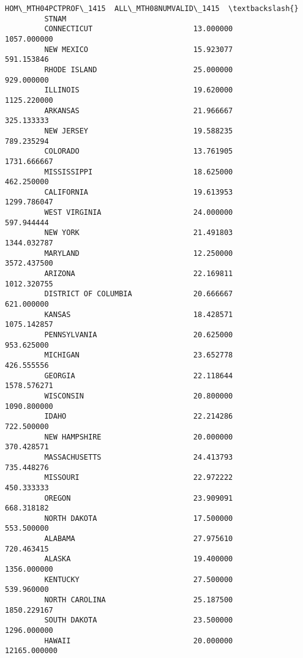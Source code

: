\documentclass[11pt]{article}
\begin{document}
\begin{Verbatim}[commandchars=\\\{\}]
                               HOM\_MTH04PCTPROF\_1415  ALL\_MTH08NUMVALID\_1415  \textbackslash{}
         STNAM                                                                 
         CONNECTICUT                       13.000000             1057.000000   
         NEW MEXICO                        15.923077              591.153846   
         RHODE ISLAND                      25.000000              929.000000   
         ILLINOIS                          19.620000             1125.220000   
         ARKANSAS                          21.966667              325.133333   
         NEW JERSEY                        19.588235              789.235294   
         COLORADO                          13.761905             1731.666667   
         MISSISSIPPI                       18.625000              462.250000   
         CALIFORNIA                        19.613953             1299.786047   
         WEST VIRGINIA                     24.000000              597.944444   
         NEW YORK                          21.491803             1344.032787   
         MARYLAND                          12.250000             3572.437500   
         ARIZONA                           22.169811             1012.320755   
         DISTRICT OF COLUMBIA              20.666667              621.000000   
         KANSAS                            18.428571             1075.142857   
         PENNSYLVANIA                      20.625000              953.625000   
         MICHIGAN                          23.652778              426.555556   
         GEORGIA                           22.118644             1578.576271   
         WISCONSIN                         20.800000             1090.800000   
         IDAHO                             22.214286              722.500000   
         NEW HAMPSHIRE                     20.000000              370.428571   
         MASSACHUSETTS                     24.413793              735.448276   
         MISSOURI                          22.972222              450.333333   
         OREGON                            23.909091              668.318182   
         NORTH DAKOTA                      17.500000              553.500000   
         ALABAMA                           27.975610              720.463415   
         ALASKA                            19.400000             1356.000000   
         KENTUCKY                          27.500000              539.960000   
         NORTH CAROLINA                    25.187500             1850.229167   
         SOUTH DAKOTA                      23.500000             1296.000000   
         HAWAII                            20.000000            12165.000000   

\end{Verbatim}
\end{document}
